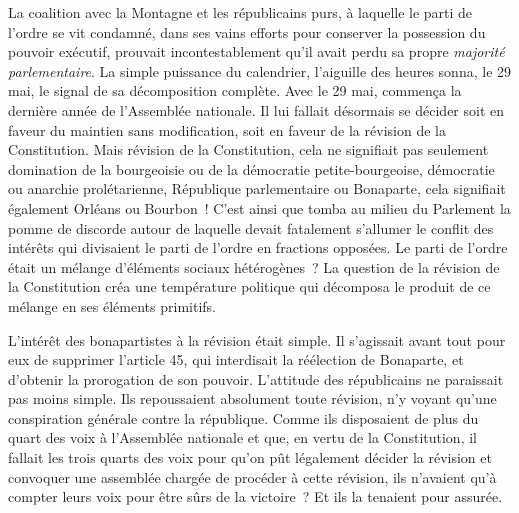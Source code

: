 \documentclass[french,twoside]{book} %
\newcommand\chaptercont{} %
\begin{document}
\chaptercont
\noindent La coalition avec la Montagne et les républicains purs, à laquelle le parti de l’ordre se vit condamné, dans ses vains efforts pour conserver la possession du pouvoir exécutif, prouvait incontestablement qu’il avait perdu sa propre \emph{majorité parlementaire}. La simple puissance du calendrier, l’aiguille des heures sonna, le 29 mai, le signal de sa décomposition complète. Avec le 29 mai, commença la dernière année de l’Assemblée nationale. Il lui fallait désormais se décider soit en faveur du maintien sans modification, soit en faveur de la révision de la Constitution. Mais révision de la Constitution, cela ne signifiait pas seulement domination de la bourgeoisie ou de la démocratie petite-bourgeoise, démocratie ou anarchie prolétarienne, République parlementaire ou Bonaparte, cela signifiait également Orléans ou Bourbon ! C’est ainsi que tomba au milieu du Parlement la pomme de discorde autour de laquelle devait fatalement s’allumer le conflit des intérêts qui divisaient le parti de l’ordre en fractions opposées. Le parti de l’ordre était un mélange d’éléments sociaux hétérogènes ? La question de la révision de la Constitution créa une température politique qui décomposa le produit de ce mélange en ses éléments primitifs.\par
L’intérêt des bonapartistes à la révision était simple. Il s’agissait avant tout pour eux de supprimer l’article 45, qui interdisait la réélection de Bonaparte, et d’obtenir la prorogation de son pouvoir. L’attitude des républicains ne paraissait pas moins simple. Ils repoussaient absolument toute révision, n’y voyant qu’une conspiration générale contre la république. Comme ils disposaient de plus du quart des voix à l’Assemblée nationale et que, en vertu de la Constitution, il fallait les trois quarts des voix pour qu’on pût légalement décider la révision et convoquer une assemblée chargée de procéder à cette révision, ils n’avaient qu’à compter leurs voix pour être sûrs de la victoire ? Et ils la tenaient pour assurée.\par
\end{document}
